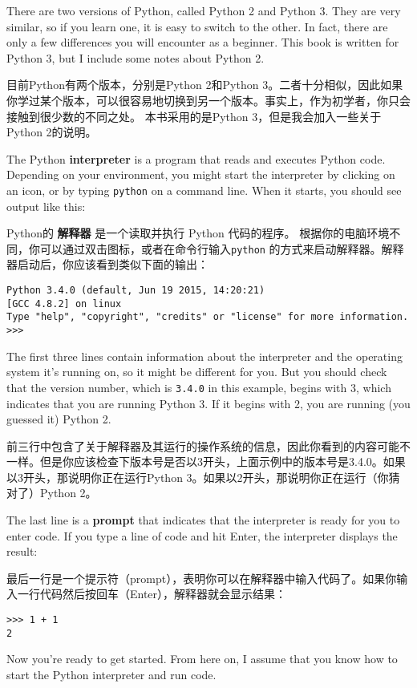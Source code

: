 There are two versions of Python, called Python 2 and Python 3.
They are very similar, so if you learn one, it is easy to switch
to the other.  In fact, there are only a few differences you will
encounter as a beginner.
This book is written for Python 3, but I include some notes
about Python 2.

目前Python有两个版本，分别是Python 2和Python 3。二者十分相似，因此如果你学过某个版本，可以很容易地切换到另一个版本。事实上，作为初学者，你只会接触到很少数的不同之处。
本书采用的是Python 3，但是我会加入一些关于Python 2的说明。

The Python {\bf interpreter} is a program that reads and executes
Python code.  Depending on your environment, you might start the
interpreter by clicking on an icon, or by typing {\tt python} on
a command line.
When it starts, you should see output like this:

Python的 \textbf{解释器} 是一个读取并执行 Python 代码的程序。  根据你的电脑环境不同，你可以通过双击图标，或者在命令行输入\lstinline{python} 的方式来启动解释器。解释器启动后，你应该看到类似下面的输出：

\begin{lstlisting}
Python 3.4.0 (default, Jun 19 2015, 14:20:21)
[GCC 4.8.2] on linux
Type "help", "copyright", "credits" or "license" for more information.
>>>
\end{lstlisting}

%
The first three lines contain information about the interpreter
and the operating system it's running on, so it might be different for
you.  But you should check that the version number, which is
{\tt 3.4.0} in this example, begins with 3, which indicates that
you are running Python 3.  If it begins with 2, you are running
(you guessed it) Python 2.

前三行中包含了关于解释器及其运行的操作系统的信息，因此你看到的内容可能不一样。但是你应该检查下版本号是否以3开头，上面示例中的版本号是3.4.0。如果以3开头，那说明你正在运行Python 3。如果以2开头，那说明你正在运行（你猜对了）Python 2。

The last line is a {\bf prompt} that indicates that the interpreter is
ready for you to enter code.
If you type a line of code and hit Enter, the interpreter displays the
result:

最后一行是一个提示符（prompt），表明你可以在解释器中输入代码了。如果你输入一行代码然后按回车（Enter），解释器就会显示结果：

\begin{lstlisting}
>>> 1 + 1
2
\end{lstlisting}
%
Now you're ready to get started.
From here on, I assume that you know how to start the Python
interpreter and run code.

